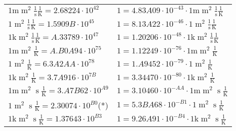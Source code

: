 \begin{center}
\begin{longtable}{l l}
{\color{gray}$1 \bm{\mathrm{ m}}{\operatorname{m}^2}\frac1{\operatorname{s}}{}\frac1{\operatorname{K}} = 2.68224\cdot10^{42} $}   & {\color{gray}$ 1 = 4.83A09\cdot10^{-43} \cdot 1 \bm{\mathrm{ m}}{\operatorname{m}^2}\frac1{\operatorname{s}}{}\frac1{\operatorname{K}}$}  \\
{\color{black}$1 \bm{\mathrm{ }}{\operatorname{m}^2}\frac1{\operatorname{s}}{}\frac1{\operatorname{K}} = 1.5909B\cdot10^{45} $}   & {\color{black}$ 1 = 8.13A22\cdot10^{-46} \cdot 1 \bm{\mathrm{ }}{\operatorname{m}^2}\frac1{\operatorname{s}}{}\frac1{\operatorname{K}}$}  \\
{\color{gray}$1 \bm{\mathrm{ k}}{\operatorname{m}^2}\frac1{\operatorname{s}}{}\frac1{\operatorname{K}} = A.33789\cdot10^{47} $}   & {\color{gray}$ 1 = 1.20206\cdot10^{-48} \cdot 1 \bm{\mathrm{ k}}{\operatorname{m}^2}\frac1{\operatorname{s}}{}\frac1{\operatorname{K}}$}  \\
{\color{gray}$1 \bm{\mathrm{ m}}{\operatorname{m}^2}{}{}\frac1{\operatorname{K}} = A.B0A94\cdot10^{75} $}   & {\color{gray}$ 1 = 1.12249\cdot10^{-76} \cdot 1 \bm{\mathrm{ m}}{\operatorname{m}^2}{}{}\frac1{\operatorname{K}}$}  \\
{\color{black}$1 \bm{\mathrm{ }}{\operatorname{m}^2}{}{}\frac1{\operatorname{K}} = 6.3A2AA\cdot10^{78} $}   & {\color{black}$ 1 = 1.A9452\cdot10^{-79} \cdot 1 \bm{\mathrm{ }}{\operatorname{m}^2}{}{}\frac1{\operatorname{K}}$}  \\
{\color{gray}$1 \bm{\mathrm{ k}}{\operatorname{m}^2}{}{}\frac1{\operatorname{K}} = 3.7A916\cdot10^{7B} $}   & {\color{gray}$ 1 = 3.34470\cdot10^{-80} \cdot 1 \bm{\mathrm{ k}}{\operatorname{m}^2}{}{}\frac1{\operatorname{K}}$}  \\
{\color{gray}$1 \bm{\mathrm{ m}}{\operatorname{m}^2}{\operatorname{s}}{}\frac1{\operatorname{K}} = 3.A7B62\cdot10^{A9} $}   & {\color{gray}$ 1 = 3.10460\cdot10^{-AA} \cdot 1 \bm{\mathrm{ m}}{\operatorname{m}^2}{\operatorname{s}}{}\frac1{\operatorname{K}}$}  \\
{\color{black}$1 \bm{\mathrm{ }}{\operatorname{m}^2}{\operatorname{s}}{}\frac1{\operatorname{K}} = 2.30074\cdot10^{B0} $}\quad(*) & {\color{black}$ 1 = 5.3BA68\cdot10^{-B1} \cdot 1 \bm{\mathrm{ }}{\operatorname{m}^2}{\operatorname{s}}{}\frac1{\operatorname{K}}$}  \\
{\color{gray}$1 \bm{\mathrm{ k}}{\operatorname{m}^2}{\operatorname{s}}{}\frac1{\operatorname{K}} = 1.37643\cdot10^{B3} $}   & {\color{gray}$ 1 = 9.26A91\cdot10^{-B4} \cdot 1 \bm{\mathrm{ k}}{\operatorname{m}^2}{\operatorname{s}}{}\frac1{\operatorname{K}}$}  \\

\end{longtable}
\end{center}
